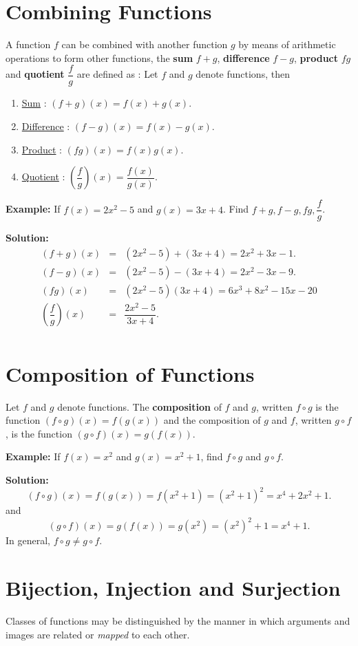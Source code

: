 \documentclass[titlepage,a4paper,12pt]{report}
\begin{document}
\section{Combining Functions}
A function $f$ can be combined with another function $g$ by means of arithmetic operations to form other functions, the \textbf{sum} $f+g$, \textbf{difference} $f-g$, \textbf{product} $fg$ and \textbf{quotient} $\dfrac{f}{g}$ are defined as : Let $f$ and $g$ denote functions, then 
\begin{enumerate}
\item \underline{Sum} : $(f+g)(x)=f(x)+g(x)$.
\item \underline{Difference} : $(f-g)(x)=f(x)-g(x)$.
\item \underline{Product} : $(fg)(x)=f(x)g(x)$.
\item \underline{Quotient} : $\left(\dfrac{f}{g}\right )(x)=\dfrac{f(x)}{g(x)}$.
\end{enumerate}
\textbf{Example:} If $f(x)=2x^2-5$ and $g(x)=3x+4$. Find $f+g, f-g, fg, \dfrac{f}{g}$.

\noindent \textbf{Solution:} \begin{eqnarray*}
(f+g)(x) &=& (2x^2-5)+(3x+4)= 2x^2+3x-1.\\
(f-g)(x)&=& (2x^2-5)-(3x+4)= 2x^2-3x-9.\\
(fg)(x)&=&(2x^2-5)(3x+4) = 6x^3+8x^2-15x-20\\
\left(\dfrac{f}{g}\right)(x)&=& \dfrac{2x^2-5}{3x+4}.\\
\end{eqnarray*}
\section{Composition of Functions}
Let $f$ and $g$ denote functions. The \textbf{composition } of $f$ and $g$, written $f\circ g$ is the function $(f\circ g)(x)=f(g(x))$ and the composition of $g$ and $f$, written $g\circ f$, is the function $(g\circ f)(x)=g(f(x))$.

\noindent \textbf{Example:} If $f(x)=x^2$ and $g(x)=x^2+1$, find $f\circ g$ and $g \circ f$.

\noindent \textbf{Solution:} \begin{equation*}
(f\circ g)(x)=f(g(x))=f(x^2+1)=(x^2+1)^2=x^4+2x^2+1.
\end{equation*}
and \begin{equation*}
(g\circ f)(x)=g(f(x))=g(x^2)=(x^2)^2+1=x^4+1.
\end{equation*}
In general, $f\circ g \neq g\circ f$.
\section{Bijection, Injection and Surjection}
Classes of functions may be distinguished by the manner in which arguments and images are related or \textit{mapped} to each other.
\end{document}
